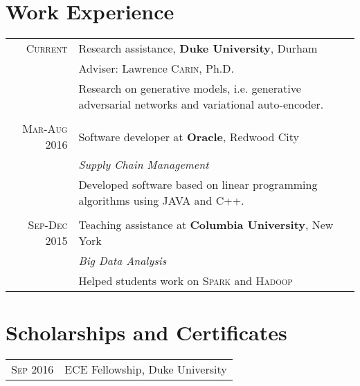 \documentclass[a4paper,10pt]{article}
\begin{document}
\section{Work Experience}
\begin{tabular}{r|p{11cm}}
 \textsc{Current} & Research assistance, \textbf{Duke University}, Durham \\
 & \small Adviser: Lawrence \textsc{Carin}, Ph.D. \\
&\footnotesize{Research on generative models, i.e. generative adversarial networks and variational auto-encoder.}\\
\multicolumn{2}{c}{} \\
 \textsc{Mar-Aug 2016} & Software developer at \textbf{Oracle}, Redwood City \\
 &\emph{Supply Chain Management}\\
 &\footnotesize{Developed software based on linear programming algorithms using JAVA and C++.}\\
 \multicolumn{2}{c}{} \\
\textsc{Sep-Dec 2015} & Teaching assistance at \textbf{Columbia University}, New York \\& \emph{Big Data Analysis}\\&\footnotesize{Helped students work on \textsc{Spark} and \textsc{Hadoop} }
\end{tabular}


\section{Scholarships and Certificates}
\begin{tabular}{rl}
 \textsc{Sep} 2016 & ECE Fellowship, Duke University \\

\end{tabular}

\end{document}
